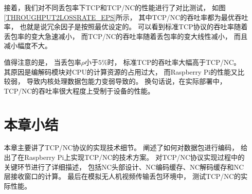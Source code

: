 接着，我们对不同丢包率下TCP和TCP/NC的性能进行了对比测试，
如图\ref{THROUGHPUT2LOSSRATE_EPS}所示，
其中TCP/NC的吞吐率都为最优吞吐率，
也就是说冗余因子是按照最优设定的。
可以看到标准TCP协议的吞吐率随着丢包率的变大急速减小，
而TCP/NC的吞吐率随着丢包率的变大线性减小，
而且减小幅度不大。
\par
值得注意的是，
当丢包率$\rho$小于$5\%$时，
标准TCP的吞吐率大幅高于TCP/NC。
其原因是编解码模块对CPU的计算资源的占用过大，
而Raspberry Pi的性能又比较弱，
导致内核处理数据包能力变弱导致的。
换句话说，在实际部署中，
TCP/NC的吞吐率很大程度上受制于设备的性能。
\section{本章小结}
本章主要讲了TCP/NC协议的实现技术细节。
阐述了如何对数据包进行编码，
给出了在Raspberry Pi上实现TCP/NC的技术方案。
对TCP/NC协议实现过程中的关键环节进行了详细描述，
包括NC头部设计、NC编码缓存、NC解码缓存和NC层接收窗口的计算。
最后在模拟无人机视频传输丢包环境中，
测试TCP/NC的实际性能。